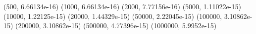 (500, 6.66134e-16) (1000, 6.66134e-16) (2000, 7.77156e-16) (5000, 1.11022e-15) (10000, 1.22125e-15) (20000, 1.44329e-15) (50000, 2.22045e-15) (100000, 3.10862e-15) (200000, 3.10862e-15) (500000, 4.77396e-15) (1000000, 5.9952e-15) 